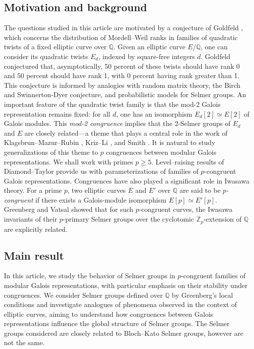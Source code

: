 \documentclass[table]{amsart}
\newcommand{\Q}{\mathbb{Q}}
\numberwithin{equation}{section}
\begin{document}
\subsection{Motivation and background}
\par The questions studied in this article are motivated by a conjecture of Goldfeld \cite{Goldfeld}, which concerns the distribution of Mordell–Weil ranks in families of quadratic twists of a fixed elliptic curve over $\mathbb{Q}$. Given an elliptic curve $E/\mathbb{Q}$, one can consider its quadratic twists $E_d$, indexed by square-free integers $d$. Goldfeld conjectured that, asymptotically, 50 percent of these twists should have rank 0 and 50 percent should have rank 1, with 0 percent having rank greater than 1. This conjecture is informed by analogies with random matrix theory, the Birch and Swinnerton-Dyer conjecture, and probabilistic models for Selmer groups. An important feature of the quadratic twist family is that the mod-2 Galois representation remains fixed: for all $d$, one has an isomorphism $E_d[2] \simeq E[2]$ of Galois modules. This \emph{mod-2 congruence} implies that the 2-Selmer groups of $E_d$ and $E$ are closely related—a theme that plays a central role in the work of Klagsbrun–Mazur–Rubin \cite{KMR}, Kriz–Li \cite{KrizLi}, and Smith \cite{smith2022distribution1, smith2022distribution2}. It is natural to study generalizations of this theme to $p$ congruences between modular Galois representations. We shall work with primes $p\geq 5$. Level--raising results of Diamond--Taylor \cite{diamond1994non} provide us with parameterizations of families of $p$-congruent Galois representations. Congruences have also played a significant role in Iwasawa theory. For a prime $p$, two elliptic curves $E$ and $E'$ over $\mathbb{Q}$ are said to be \emph{$p$-congruent} if there exists a Galois-module isomorphism $E[p] \simeq E'[p]$. Greenberg and Vatsal \cite{greenberg2000iwasawa} showed that for such $p$-congruent curves, the Iwasawa invariants of their $p$-primary Selmer groups over the cyclotomic $\mathbb{Z}_p$-extension of $\mathbb{Q}$ are explicitly related.

\subsection{Main result}
\par In this article, we study the behavior of Selmer groups in $p$-congruent families of modular Galois representations, with particular emphasis on their stability under congruences. We consider Selmer groups defined over $\Q$ by Greenberg's local conditions and investigate analogues of phenomena observed in the context of elliptic curves, aiming to understand how congruences between Galois representations influence the global structure of Selmer groups. The Selmer groups considered are closely related to Bloch--Kato Selmer groups, however are not the same.
\end{document}
